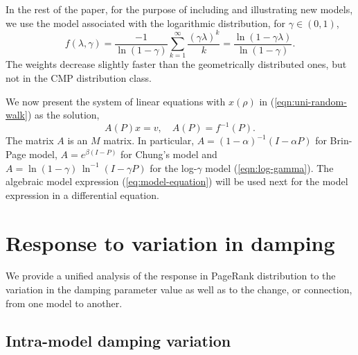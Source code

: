 \documentclass[conference]{IEEEtran}
\begin{document}
In the rest of the paper, for the purpose of including and illustrating
new models, we use the model associated with the logarithmic
distribution, for $\gamma \in (0,1)$, 
%
\begin{equation}
\label{eqn:log-gamma} 
 f(\lambda,\gamma) =
    \frac{-1}{\ln(1 - \gamma)} 
    \sum_{k = 1}^{\infty} \frac{(\gamma\lambda)^{k}}{k}
   = \frac{\ln(1 - \gamma\lambda)}{\ln(1 - \gamma)}. 
\end{equation}%
%
The weights decrease slightly faster than the geometrically distributed
ones, but not in the CMP distribution class. 

We now present the system of linear equations with $x(\rho)$ in 
(\ref{eqn:uni-random-walk}) as the solution, 
% 
\begin{equation}
\label{eq:model-equation} 
A(P)x = v, 
\quad A(P) = f^{-1}(P). 
\end{equation}%
%
The matrix $A$ is an $M$ matrix. In particular, 
$A = (1-\alpha)^{-1}(I - \alpha P)$ for Brin-Page model,
$A = e^{\beta (I - P)}$ for Chung's model and
$A= \ln(1-\gamma) \, \ln^{-1}(I - \gamma P) $ for the log-$\gamma$
model (\ref{eqn:log-gamma}).
% 
The algebraic model expression (\ref{eq:model-equation}) will be used
next for the model expression in a differential equation.





%



 
%


\section{Response to variation in damping}
\label{sec:theory-analysis}
%


We provide a unified analysis of the response in PageRank distribution
to the variation in the damping parameter value as well as to the
change, or connection, from one model to another.

\subsection{Intra-model damping variation}
\label{subsec:pagerank-sensitive}
\end{document}
